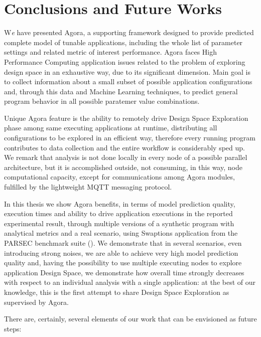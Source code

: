 \chapter{Conclusions and Future Works}\label{end}

\lettrine{W}{}\textit{e} have presented Agora, a supporting framework designed to provide predicted complete model of tunable applications, including the whole list of parameter settings and related metric of interest performance. Agora faces High Performance Computing application issues related to the problem of exploring design space in an exhaustive way, due to its significant dimension. Main goal is to collect information about a small subset of possible application configurations and, through this data and Machine Learning techniques, to predict general program behavior in all possible paratemer value combinations.

Unique Agora feature is the ability to remotely drive Design Space Exploration phase among same executing applications at runtime, distributing all configurations to be explored in an efficient way, therefore every running program contributes to data collection and the entire workflow is considerably sped up. We remark that analysis is not done locally in every node of a possible parallel architecture, but it is accomplished outside, not consuming, in this way, node computational capacity, except for communications among Agora modules, fulfilled by the lightweight MQTT messaging protocol.

In this thesis we show Agora benefits, in terms of model prediction quality, execution times and ability to drive application executions in the reported experimental result, through multiple versions of a synthetic program with analytical metrics and a real scenario, using Swaptions application from the PARSEC benchmark suite (\cite{bienia2008parsec}). We demonstrate that in several scenarios, even introducing strong noises, we are able to achieve very high model prediction quality and, having the possibility to use multiple executing nodes to explore application Design Space, we demonstrate how overall time strongly decreases with respect to an individual analysis with a single application: at the best of our knowledge, this is the first attempt to share Design Space Exploration as supervised by Agora.

There are, certainly, several elements of our work that can be envisioned as future steps:

